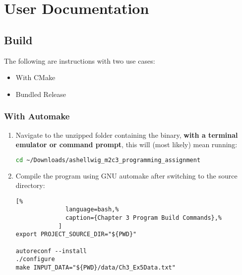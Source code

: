 \documentclass[a4paper, 11pt]{article}
\begin{document}
  \newpage
  \section{User Documentation}

    \subsection{Build}
      The following are instructions with two use cases:
      \begin{itemize}
        \item With CMake
        \item Bundled Release
      \end{itemize}
      \subsubsection{With Automake}
        \begin{enumerate}
          \item Navigate to the unzipped folder containing the binary,
            \textbf{with a terminal emulator or command prompt}, this will
            (most likely) mean running:
            \begin{lstlisting}[language=bash]
cd ~/Downloads/ashellwig_m2c3_programming_assignment
            \end{lstlisting}
          \item Compile the program using GNU automake after switching to the
            source directory:
            \begin{lstlisting}[%
              language=bash,%
              caption={Chapter 3 Program Build Commands},%
            ]
export PROJECT_SOURCE_DIR="${PWD}"

autoreconf --install
./configure
make INPUT_DATA="${PWD}/data/Ch3_Ex5Data.txt"
            \end{lstlisting}
          \end{enumerate}
\end{document}
